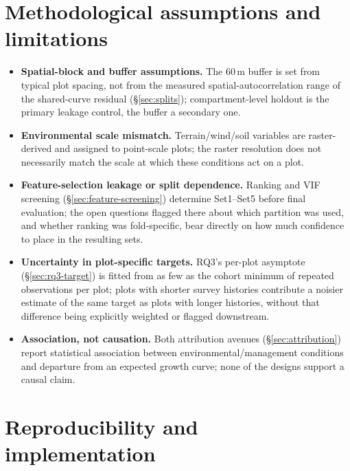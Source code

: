 \section{Methodological assumptions and limitations}
\label{sec:limitations}


\begin{itemize}
\setlength\itemsep{0pt}
\item \textbf{Spatial-block and buffer assumptions.} The 60\,m buffer is set from typical plot
  spacing, not from the measured spatial-autocorrelation range of the shared-curve residual
  (\S\ref{sec:splits}); compartment-level holdout is the primary leakage control, the buffer a
  secondary one.
\item \textbf{Environmental scale mismatch.} Terrain/wind/soil variables are raster-derived and
  assigned to point-scale plots; the raster resolution does not necessarily match the scale at
  which these conditions act on a plot.
\item \textbf{Feature-selection leakage or split dependence.} Ranking and VIF screening
  (\S\ref{sec:feature-screening}) determine Set1--Set5 before final evaluation; the open questions
  flagged there about which partition was used, and whether ranking was fold-specific, bear
  directly on how much confidence to place in the resulting sets.
\item \textbf{Uncertainty in plot-specific targets.} RQ3's per-plot asymptote
  (\S\ref{sec:rq3-target}) is fitted from as few as the cohort minimum of repeated observations
  per plot; plots with shorter survey histories contribute a noisier estimate of the same target
  as plots with longer histories, without that difference being explicitly weighted or flagged
  downstream.
\item \textbf{Association, not causation.} Both attribution avenues (\S\ref{sec:attribution})
  report statistical association between environmental/management conditions and departure from
  an expected growth curve; none of the designs support a causal claim.
\end{itemize}

\section{Reproducibility and implementation}
\label{sec:reproducibility}

